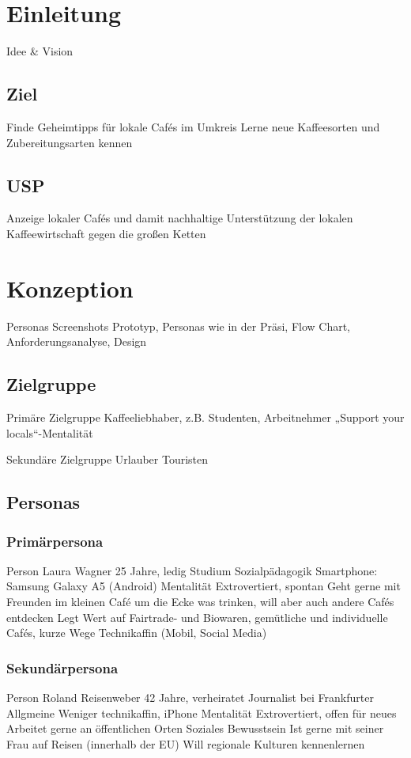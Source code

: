 \chapter{Einleitung}
\label{einleitung}
Idee & Vision

\section{Ziel}
Finde Geheimtipps für lokale Cafés im Umkreis
Lerne neue Kaffeesorten und Zubereitungsarten kennen

\section{USP}
Anzeige lokaler Cafés und damit nachhaltige Unterstützung der lokalen Kaffeewirtschaft gegen die großen Ketten



\chapter{Konzeption}
\label{konzeption}
Personas Screenshots Prototyp, Personas wie in der Präsi, Flow Chart, Anforderungsanalyse, Design

\section{Zielgruppe}
Primäre Zielgruppe
Kaffeeliebhaber, z.B. Studenten, Arbeitnehmer
„Support your locals“-Mentalität

Sekundäre Zielgruppe
Urlauber
Touristen

\section{Personas}
\subsection{Primärpersona}
Person
Laura Wagner
25 Jahre, ledig
Studium Sozialpädagogik
Smartphone: Samsung Galaxy A5 (Android)
Mentalität
Extrovertiert, spontan
Geht gerne mit Freunden im kleinen Café um die Ecke was trinken, will aber auch andere Cafés entdecken
Legt Wert auf Fairtrade- und Biowaren, gemütliche und individuelle Cafés, kurze Wege
Technikaffin (Mobil, Social Media)

\subsection{Sekundärpersona}
Person
Roland Reisenweber
42 Jahre, verheiratet
Journalist bei Frankfurter Allgmeine
Weniger technikaffin, iPhone
Mentalität
Extrovertiert, offen für neues
Arbeitet gerne an öffentlichen Orten
Soziales Bewusstsein
Ist gerne mit seiner Frau auf Reisen (innerhalb der EU)
Will regionale Kulturen kennenlernen


